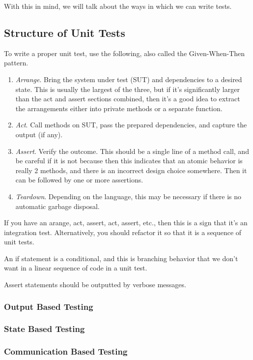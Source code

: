   With this in mind, we will talk about the ways in which we can write tests. 

\subsection{Structure of Unit Tests}

  To write a proper unit test, use the following, also called the Given-When-Then pattern. 
  \begin{enumerate}
    \item \textit{Arrange}. Bring the system under test (SUT) and dependencies to a desired state. This is usually the largest of the three, but if it's significantly larger than the act and assert sections combined, then it's a good idea to extract the arrangements either into private methods or a separate function. 
    \item \textit{Act}. Call methods on SUT, pass the prepared dependencies, and capture the output (if any). 
    \item \textit{Assert}. Verify the outcome. This should be a single line of a method call, and be careful if it is not because then this indicates that an atomic behavior is really 2 methods, and there is an incorrect design choice somewhere. Then it can be followed by one or more assertions. 
    \item \textit{Teardown}. Depending on the language, this may be necessary if there is no automatic garbage disposal. 
  \end{enumerate}

  If you have an arange, act, assert, act, assert, etc., then this is a sign that it's an integration test. Alternatively, you should refactor it so that it is a sequence of unit tests. 

  \begin{theorem}
    An if statement is a conditional, and this is branching behavior that we don't want in a linear sequence of code in a unit test. 
  \end{theorem}  

  Assert statements should be outputted by verbose messages. 

\subsubsection{Output Based Testing}

  \begin{definition}
    
  \end{definition}

\subsubsection{State Based Testing}

  \begin{definition}
    
  \end{definition}

\subsubsection{Communication Based Testing}

  \begin{definition}
    
  \end{definition}

